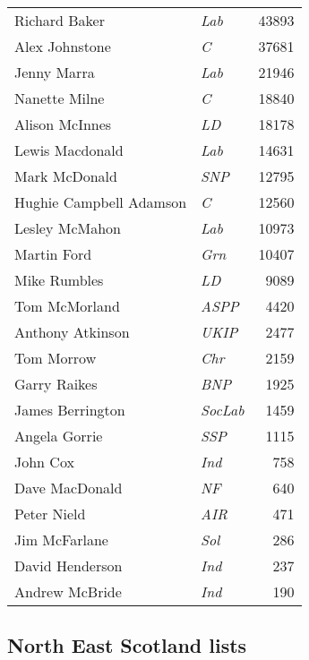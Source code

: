 {\footnotesize
\begin{tabular*}{\columnwidth}{@{\extracolsep{\fill}} p{} >{\itshape}l r @{\extracolsep{\fill}}}
Richard Baker & Lab & 43893\\%
Alex Johnstone & C & 37681\\%
Jenny Marra & Lab & 21946\\%
Nanette Milne & C & 18840\\%
Alison McInnes & LD & 18178\\%
Lewis Macdonald & Lab & 14631\\%
Mark McDonald & SNP & 12795\\%
\hline
Hughie Campbell Adamson & C & 12560\\
Lesley McMahon & Lab & 10973\\
Martin Ford & Grn & 10407\\
Mike Rumbles & LD & 9089\\
Tom McMorland & ASPP & 4420\\
Anthony Atkinson & UKIP & 2477\\
Tom Morrow & Chr & 2159\\
Garry Raikes & BNP & 1925\\
James Berrington & SocLab & 1459\\
Angela Gorrie & SSP & 1115\\
John Cox & Ind & 758\\
Dave MacDonald & NF & 640\\
Peter Nield & AIR & 471\\
Jim McFarlane & Sol & 286\\
David Henderson & Ind & 237\\
Andrew McBride & Ind & 190\\
\end{tabular*}

}

\vfill

\subsection*{North East Scotland lists}

